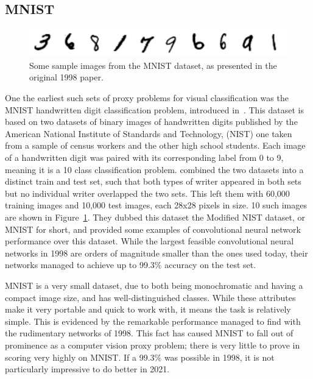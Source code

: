 \subsection{MNIST}
\begin{figure}[htbp!]
\centering
\includegraphics[width=1\textwidth]{data/mnist_sample}
\caption[Sample MNIST images]{Some sample images from the MNIST dataset, as presented in the original 1998 paper.}
\label{fig:mnist}
\end{figure}

One the earliest such sets of proxy problems for visual classification was the MNIST handwritten digit classification problem,
introduced in~\cite{lecun1998}. This dataset is based
on two datasets of binary images of handwritten digits published by the American National Institute of Standards and Technology,
(NIST) one taken from a sample of census workers and the other high school students. Each image of a handwritten digit
was paired with its corresponding label from 0 to 9, meaning it is a 10 class classification problem.
\citeauthor{lecun1998} combined the two datasets into a distinct train and test set, such that both types of writer appeared in both
sets but no individual writer overlapped the two sets. This left them with 60,000 training images and 10,000 test images,
each 28x28 pixels in size. 10 such images are shown in Figure~\ref{fig:mnist}. They dubbed this dataset the Modified NIST dataset, or MNIST for short, and provided some
examples of convolutional neural network performance over this dataset. While the largest feasible convolutional
neural networks in 1998 are orders of magnitude smaller than the ones used today, their networks managed to achieve up
to 99.3\% accuracy on the test set.

MNIST is a very small dataset, due to both being monochromatic and having a compact image size, and has well-distinguished
classes. While these attributes make it very portable and quick to work with, it means the task is relatively simple.
This is evidenced by the remarkable performance \citeauthor{lecun1998} managed to find with the rudimentary networks of 1998. This
fact has caused MNIST to fall out of prominence as a computer vision proxy problem; there is very little to prove in scoring
very highly on MNIST. If a 99.3\% was possible in 1998, it is not particularly impressive to do better in 2021.


